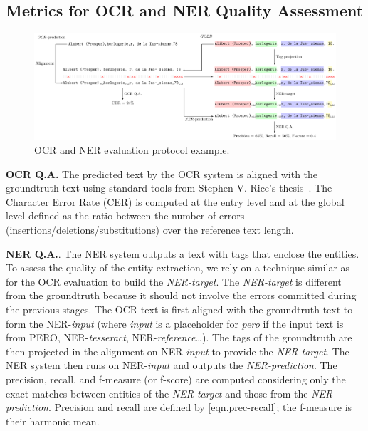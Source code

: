 




\subsection{Metrics for OCR and NER Quality Assessment}

\begin{figure}[tb]
    \includegraphics[width=\linewidth]{figs/eval-ocr-ner.pdf}
    \caption{OCR and NER evaluation protocol example.}
    \label{fig.eval-ocr-ner}
\end{figure}

\textbf{OCR Q.A.}  The predicted text by the OCR system is aligned with the groundtruth text using standard tools from
Stephen V. Rice's thesis~\cite{santos.2019.wcmel,neudecker.2021.whdip}. The Character Error Rate (CER) is computed at
the entry level and at the global level defined as the ratio between the number of errors
(insertions/deletions/substitutions) over the reference text length. 



\textbf{NER Q.A.}. The NER system outputs a text with tags that enclose the entities. To assess the quality of the
entity extraction, we rely on a technique similar as for the OCR evaluation to build the \emph{NER-target}. The
\emph{NER-target} is different from the groundtruth because it should not involve the errors committed during the
previous stages. The OCR text is first aligned with the groundtruth text to form the NER-\emph{input} (where
\emph{input} is a placeholder for \emph{pero} if the input text is from PERO, NER-\emph{tesseract},
NER-\emph{reference}\ldots). The tags of the groundtruth are then projected in the alignment on NER-\emph{input} to
provide the \emph{NER-target}. The NER system then runs on NER-\emph{input} and outputs the \emph{NER-prediction}. The
precision, recall, and f-measure (or f-score) are computed considering only the exact matches between entities of the
\emph{NER-target} and those from the \emph{NER-prediction}. Precision and recall are defined by \cref{eqn.prec-recall};
the f-measure is their harmonic mean.

